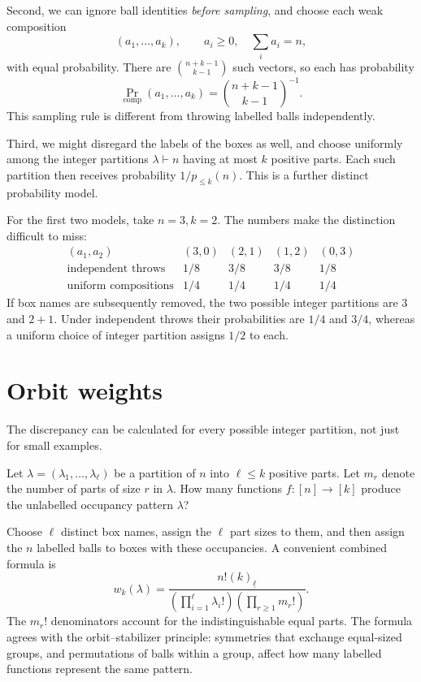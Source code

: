 Second, we can ignore ball identities \emph{before sampling}, and choose each weak composition
\[
 (a_1,\ldots,a_k),\qquad a_i\ge0,\quad \sum_i a_i=n,
\]
with equal probability. There are \(\binom{n+k-1}{k-1}\) such vectors, so each has probability
\[
 \Pr_{\mathrm{comp}}(a_1,\ldots,a_k)
 =\binom{n+k-1}{k-1}^{-1}.
\]
This sampling rule is different from throwing labelled balls independently.

Third, we might disregard the labels of the boxes as well, and choose uniformly among the integer partitions \(\lambda\vdash n\) having at most \(k\) positive parts. Each such partition then receives probability \(1/p_{\le k}(n)\). This is a further distinct probability model.

For the first two models, take \(n=3,k=2\). The numbers make the distinction difficult to miss:
\[
\begin{array}{c|cccc}
 (a_1,a_2)&(3,0)&(2,1)&(1,2)&(0,3)\\ \hline
 \text{independent throws}&1/8&3/8&3/8&1/8\\
 \text{uniform compositions}&1/4&1/4&1/4&1/4
\end{array}
\]
If box names are subsequently removed, the two possible integer partitions are \(3\) and \(2+1\). Under independent throws their probabilities are \(1/4\) and \(3/4\), whereas a uniform choice of integer partition assigns \(1/2\) to each.

\section{Orbit weights}

The discrepancy can be calculated for every possible integer partition, not just for small examples.

Let \(\lambda=(\lambda_1,\ldots,\lambda_\ell)\) be a partition of \(n\) into \(\ell\le k\) positive parts. Let \(m_r\) denote the number of parts of size \(r\) in \(\lambda\). How many functions \(f:[n]\to[k]\) produce the unlabelled occupancy pattern \(\lambda\)?

Choose \(\ell\) distinct box names, assign the \(\ell\) part sizes to them, and then assign the \(n\) labelled balls to boxes with these occupancies. A convenient combined formula is
\[
 \boxed{w_k(\lambda)=
 \frac{n!(k)_{\underline\ell}}
      {\left(\prod_{i=1}^{\ell}\lambda_i!\right)
       \left(\prod_{r\ge1}m_r!\right)}.}
\]
The \(m_r!\) denominators account for the indistinguishable equal parts. The formula agrees with the orbit--stabilizer principle: symmetries that exchange equal-sized groups, and permutations of balls within a group, affect how many labelled functions represent the same pattern.

